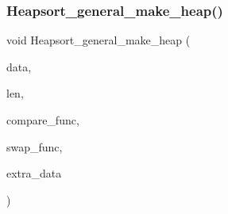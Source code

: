 \subsubsection{\texorpdfstring{Heapsort\+\_\+general\+\_\+make\+\_\+heap()}{Heapsort\_general\_make\_heap()}}
{\footnotesize\ttfamily void Heapsort\+\_\+general\+\_\+make\+\_\+heap (\begin{DoxyParamCaption}\item[{void $\ast$}]{data,  }\item[{\mbox{\hyperlink{galois_8h_a09fddde158a3a20bd2dcadb609de11dc}{I\+NT}}}]{len,  }\item[{\mbox{\hyperlink{galois_8h_a09fddde158a3a20bd2dcadb609de11dc}{I\+NT}}($\ast$)(void $\ast$data, \mbox{\hyperlink{galois_8h_a09fddde158a3a20bd2dcadb609de11dc}{I\+NT}} \mbox{\hyperlink{alphabet2_8_c_acb559820d9ca11295b4500f179ef6392}{i}}, \mbox{\hyperlink{galois_8h_a09fddde158a3a20bd2dcadb609de11dc}{I\+NT}} \mbox{\hyperlink{alphabet2_8_c_a37d972ae0b47b9099e30983131d31916}{j}}, void $\ast$extra\+\_\+data)}]{compare\+\_\+func,  }\item[{void($\ast$)(void $\ast$data, \mbox{\hyperlink{galois_8h_a09fddde158a3a20bd2dcadb609de11dc}{I\+NT}} \mbox{\hyperlink{alphabet2_8_c_acb559820d9ca11295b4500f179ef6392}{i}}, \mbox{\hyperlink{galois_8h_a09fddde158a3a20bd2dcadb609de11dc}{I\+NT}} \mbox{\hyperlink{alphabet2_8_c_a37d972ae0b47b9099e30983131d31916}{j}}, void $\ast$extra\+\_\+data)}]{swap\+\_\+func,  }\item[{void $\ast$}]{extra\+\_\+data }\end{DoxyParamCaption})}

\mbox{\label{sorting_8_c_ac889c1f2ef01fe17e267ac9268c97260}} 
